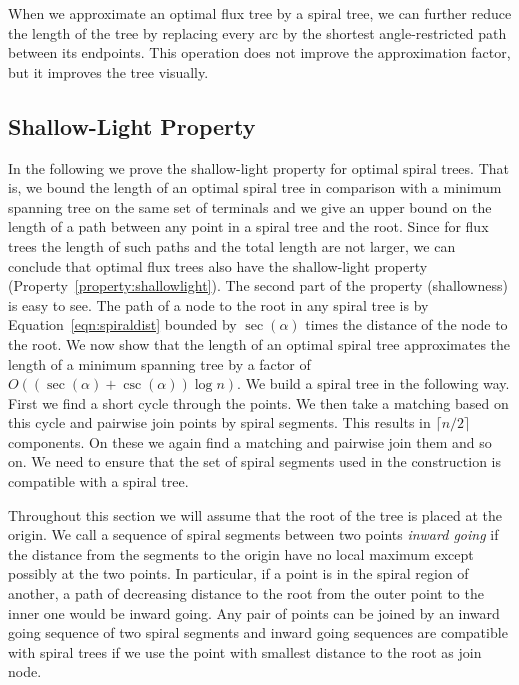 \documentclass{journalA4}
\begin{document}
When we approximate an optimal flux tree by a spiral tree, we can further reduce the length of the tree by replacing every arc by the shortest angle-restricted path between its endpoints.
This operation does not improve the approximation factor, but it improves the tree visually.

\subsection{Shallow-Light Property}\label{sec:shallowlight}
In the following we prove the shallow-light property for optimal spiral trees. That is, we bound the length of an optimal spiral tree in comparison with a minimum spanning tree on the same set of terminals and we give an upper bound on the length of a path between any point in a spiral tree and the root. Since for flux trees the length of such paths and the total length are not larger, we can conclude that optimal flux trees also have the shallow-light property (Property~\ref{property:shallowlight}).
The second part of the property (shallowness) is easy to see.
The path of a node to the root in any spiral tree is by Equation~\ref{eqn:spiraldist}
bounded by $\sec(\alpha)$ times the distance of the node to the root. 
We now show that the length of an optimal spiral tree approximates the length of a minimum spanning tree by a factor of $O((\sec(\alpha) + \csc (\alpha)) \log n )$. We build a spiral tree in the following way.
 First we find a short cycle through the points. We then take a matching based on this cycle and pairwise join points by spiral segments. This results in $\lceil n/2 \rceil$ components. On these we again find a matching and pairwise join them and so on. We need to ensure that the set of spiral segments used in the construction is compatible with a spiral tree.

 Throughout this section we will assume that the root of the tree is placed at the origin. We call a sequence of spiral segments between two points \emph{inward going} if the distance from the segments to the origin have no local maximum except possibly at the two points. In particular, if a point is in the spiral region of another, a path of decreasing distance to the root from the outer point to the inner one would be inward going. Any pair of points can be joined by an inward going sequence of two spiral segments and inward going sequences are compatible with spiral trees if we use the point with smallest distance to the root as join node.
\end{document}
